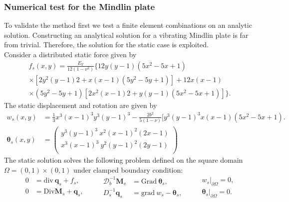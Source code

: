 \subsubsection{Numerical test for the Mindlin plate}
To validate the method first we test a finite element combinations on an analytic solution. Constructing an analytical solution for a vibrating Mindlin plate is far from trivial. Therefore, the solution for the static case \cite{veiga2013} is exploited. \\
Consider a distributed static force given by 
\begin{equation*}
\begin{aligned}
f_s(x,y)=\frac{E_Y}{12 (1-\nu^2)} \{12 y(y-1)(5x^2-5x+1) \\
\times [2y^2(y-1)2+x(x-1)(5y^2-5y+1)] +12x(x-1)\\
\times (5y^2-5y+1)[2x^2(x-1)2+y(y-1)(5x^2-5x+1)]\}.
\end{aligned}
\end{equation*}
The static displacement and rotation are given by
\begin{align*}
w_s(x,y) &= \frac{1}{3} x^3(x-1)^3 y^3 (y-1)^3 -\frac{2 b^2}{5(1-\nu)}[y^3(y-1)^3 x(x-1)(5 x^2-5x+1). \\
\bm{\theta}_{s}(x,y) &= 
\begin{pmatrix}
y^3(y-1)^3 \ x^2 (x-1)^2 (2x-1) \\
x^3(x-1)^3 \ y^2 (y-1)^2 (2y-1) \\
\end{pmatrix}
\end{align*}
The static solution solves the following problem defined on the square domain $\Omega=(0,1)\times(0,1)$ under clamped boundary condition:
\begin{equation}
\begin{aligned}
0 &= \mathrm{div} \ \bm{q}_s + f_s , \\
0 &= \mathrm{Div} \bm{M}_s + \bm{q}_s, \\
\end{aligned} \qquad
\begin{aligned}
\bm{\mathcal{D}}_b^{-1} \bm{M}_s &= \mathrm{Grad} \ \bm{\theta}_s, \\
D_s^{-1} \bm{q}_s &= \mathrm{grad} \ w_s - \bm{\theta}_s, \\
\end{aligned}
\qquad
\begin{aligned}
w_s\vert_{\partial\Omega} = 0, \\
\bm{\theta}_s\vert_{\partial\Omega} = 0. \\
\end{aligned}
\end{equation}
